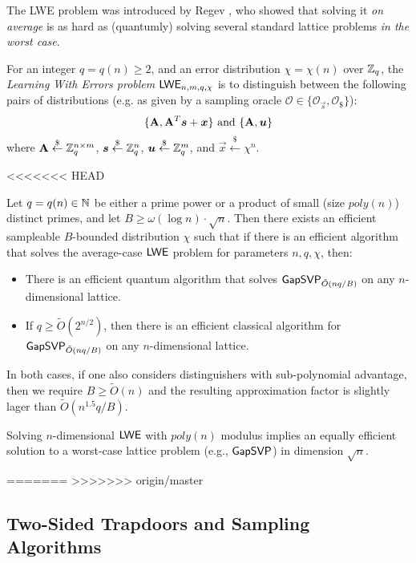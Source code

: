 The LWE problem was introduced by Regev \cite{STOC:Regev05}, who showed that solving it \emph{on average} is
as hard as (quantumly) solving several standard lattice problems \emph{in the worst case}.
\begin{definition}[LWE]\label{defn:lwe}
For an integer $q = q(n) \geq 2$, and an error distribution $\chi = \chi(n)$ over $\mathbb{Z}_q$, the \emph{Learning With Errors problem $\mathsf{LWE}_{n, m, q, \chi}$} is to distinguish between the following pairs of distributions (e.g. as given by a sampling oracle $\mathcal{O}\in\{\mathcal{O}_{\vec{s}}, \mathcal{O}_{\$}\}$):
$$\{\mathbf{A}, \mathbf{A}^{T}\boldsymbol{s} + \boldsymbol{x}\} \  \text{and} \ \{\mathbf{A}, \boldsymbol{u}\}$$
where $\mathbf{A} \overset{\$}{\leftarrow}\mathbb{Z}^{n \times m}_q$, $\boldsymbol{s} \overset{\$}{\leftarrow} \mathbb{Z}^n_q$, $\boldsymbol{u} \overset{\$}{\leftarrow} \mathbb{Z}^m_q$, and $\vec{x} \overset{\$}{\leftarrow} \chi^n$.
\end{definition}
<<<<<<< HEAD
\begin{theorem}
Let $q=q(n) \in \mathbb{N}$ be either a prime power or a product of small (size $poly(n)$) distinct primes, and let $B \geq \omega(\log n)\cdot \sqrt{n}$. Then there exists an efficient sampleable $B$-bounded distribution $\chi$ such that if there is an efficient algorithm that solves the average-case $\mathsf{LWE}$ problem for parameters $n, q, \chi$, then:
\begin{itemize}
 \item There is an efficient quantum algorithm that solves $\mathsf{GapSVP}_{\tilde{O}(nq/B)}$ on any $n$-dimensional lattice.
 \item If $q\geq \tilde{O}(2^{n/2})$, then there is an efficient classical algorithm for $\mathsf{GapSVP}_{\tilde{O}(nq/B)}$ on any $n$-dimensional lattice.
\end{itemize}
In both cases, if one also considers distinguishers with sub-polynomial advantage, then we require $B\geq \tilde{O}(n)$ and the resulting approximation factor is slightly lager than $\tilde{O}(n^{1.5}q/B)$.
\end{theorem}
\begin{theorem}
Solving $n$-dimensional $\mathsf{LWE}$ with $poly(n)$ modulus implies an equally efficient solution to a worst-case lattice problem (e.g., $\mathsf{GapSVP}$) in dimension $\sqrt{n}$.
\end{theorem}
=======
>>>>>>> origin/master

\subsection{Two-Sided Trapdoors and Sampling Algorithms}

